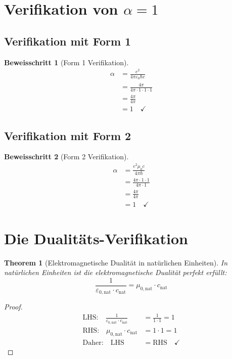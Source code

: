 \documentclass[12pt,a4paper]{article}
\newcommand{\alphaem}{\alpha}
\newtheorem{theorem}{Theorem}[section]
\newtheorem{proof_step}{Beweisschritt}[section]
\begin{document}
	\section{Verifikation von $\alpha = 1$}
	
	\subsection{Verifikation mit Form 1}
	
	\begin{proof_step}[Form 1 Verifikation]
		\begin{align}
			\alphaem &= \frac{e^2}{4\pi\varepsilon_0\hbar c}\\
			&= \frac{4\pi}{4\pi \cdot 1 \cdot 1 \cdot 1}\\
			&= \frac{4\pi}{4\pi}\\
			&= 1 \quad \checkmark
		\end{align}
	\end{proof_step}
	
	\subsection{Verifikation mit Form 2}
	
	\begin{proof_step}[Form 2 Verifikation]
		\begin{align}
			\alphaem &= \frac{e^2 \mu_0 c}{4\pi \hbar}\\
			&= \frac{4\pi \cdot 1 \cdot 1}{4\pi \cdot 1}\\
			&= \frac{4\pi}{4\pi}\\
			&= 1 \quad \checkmark
		\end{align}
	\end{proof_step}
	
	\section{Die Dualitäts-Verifikation}
	
	\begin{theorem}[Elektromagnetische Dualität in natürlichen Einheiten]
		In natürlichen Einheiten ist die elektromagnetische Dualität perfekt erfüllt:
		\begin{equation}
			\frac{1}{\varepsilon_{0,\text{nat}} \cdot c_{\text{nat}}} = \mu_{0,\text{nat}} \cdot c_{\text{nat}}
		\end{equation}
	\end{theorem}
	
	\begin{proof}
		\begin{align}
			\text{LHS:} \quad \frac{1}{\varepsilon_{0,\text{nat}} \cdot c_{\text{nat}}} &= \frac{1}{1 \cdot 1} = 1\\
			\text{RHS:} \quad \mu_{0,\text{nat}} \cdot c_{\text{nat}} &= 1 \cdot 1 = 1\\
			\text{Daher:} \quad \text{LHS} &= \text{RHS} \quad \checkmark
		\end{align}
	\end{proof}
	
\end{document}
